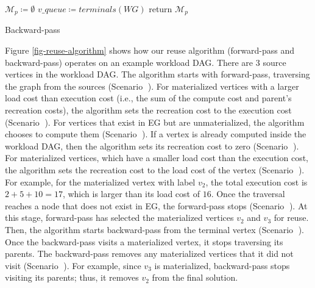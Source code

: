 \begin{algorithm}[h]
$\mathcal{M}_p \coloneqq \emptyset$\;
$v\_queue \coloneqq terminals(WG)$\;
return $\mathcal{M}_p$\;
\caption{Backward-pass}\label{backward-pass}
\end{algorithm}

Figure \ref{fig-reuse-algorithm} shows how our reuse algorithm (forward-pass and backward-pass) operates on an example workload DAG.
There are 3 source vertices in the workload DAG.
The algorithm starts with forward-pass, traversing the graph from the sources (Scenario \textcircled{}).
For materialized vertices with a larger load cost than execution cost (i.e., the sum of the compute cost and parent's recreation costs), the algorithm sets the recreation cost to the execution cost (Scenario \textcircled{}).
For vertices that exist in EG but are unmaterialized, the algorithm chooses to compute them (Scenario \textcircled{}).
If a vertex is already computed inside the workload DAG, then the algorithm sets its recreation cost to zero (Scenario \textcircled{}).
For materialized vertices, which have a smaller load cost than the execution cost, the algorithm sets the recreation cost to the load cost of the vertex (Scenario \textcircled{}).
For example, for the materialized vertex with label $v_2$, the total execution cost is $2 + 5 + 10 = 17$, which is larger than its load cost of $16$.
Once the traversal reaches a node that does not exist in EG, the forward-pass stops (Scenario \textcircled{}).
At this stage, forward-pass has selected the materialized vertices $v_2$ and $v_3$ for reuse.
Then, the algorithm starts backward-pass from the terminal vertex (Scenario \textcircled{}).
Once the backward-pass visits a materialized vertex, it stops traversing its parents.
The backward-pass removes any materialized vertices that it did not visit (Scenario \textcircled{}).
For example, since $v_3$ is materialized, backward-pass stops visiting its parents; thus, it removes $v_2$ from the final solution.

